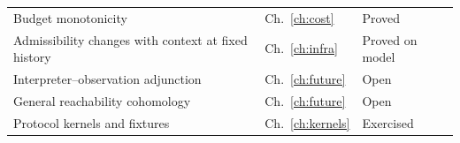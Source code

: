 \documentclass[12pt,oneside,openany]{book}
\theoremstyle{spherepop}
\theoremstyle{remarkstyle}
\begin{document}
\begin{center}
\begin{longtable}{p{}p{}p{}}
Budget monotonicity & Ch.~\ref{ch:cost} & Proved \\
Admissibility changes with context at fixed history & Ch.~\ref{ch:infra} & Proved on model \\
Interpreter--observation adjunction & Ch.~\ref{ch:future} & Open \\
General reachability cohomology & Ch.~\ref{ch:future} & Open \\
Protocol kernels and fixtures & Ch.~\ref{ch:kernels} & Exercised \\
\bottomrule
\end{longtable}
\end{center}

\backmatter

\renewcommand{\bibname}{References}
\end{document}
